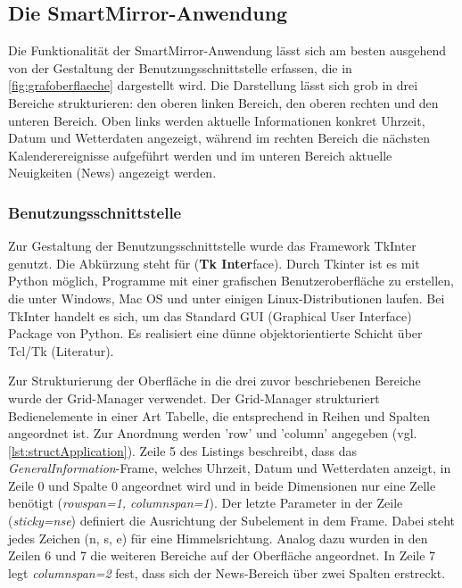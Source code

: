 \subsection{Die SmartMirror-Anwendung}
\label{smartMirror}
Die Funktionalität der SmartMirror-Anwendung lässt sich am besten ausgehend von der Gestaltung der Benutzungsschnittstelle erfassen, die in \autoref{fig:grafoberflaeche} dargestellt wird. Die Darstellung lässt sich grob in drei Bereiche strukturieren: den oberen linken Bereich, den oberen rechten und den unteren Bereich. Oben links werden aktuelle Informationen konkret Uhrzeit, Datum und Wetterdaten angezeigt, während im rechten Bereich die nächsten Kalenderereignisse aufgeführt werden und im unteren Bereich aktuelle Neuigkeiten (News) angezeigt werden. 

\subsubsection*{Benutzungsschnittstelle}

Zur Gestaltung der Benutzungsschnittstelle wurde das Framework TkInter genutzt. Die Abkürzung steht für (\textbf{Tk Inter}face).  Durch Tkinter ist es mit Python möglich, Programme mit einer grafischen Benutzeroberfläche zu erstellen, die unter Windows, Mac OS und unter einigen Linux-Distributionen laufen. Bei TkInter handelt es sich, um das Standard GUI (Graphical User Interface) Package von Python. Es realisiert eine dünne objektorientierte Schicht über Tcl/Tk (Literatur). 

Zur Strukturierung der Oberfläche in die drei zuvor beschriebenen Bereiche wurde der Grid-Manager verwendet. Der Grid-Manager strukturiert Bedienelemente in einer Art Tabelle, die entsprechend in Reihen und Spalten angeordnet ist. Zur Anordnung werden 'row' und 'column' angegeben (vgl. \autoref{lst:structApplication}). Zeile 5 des Listings beschreibt, dass das \textit{GeneralInformation}-Frame, welches Uhrzeit, Datum und Wetterdaten anzeigt, in Zeile 0 und Spalte 0 angeordnet wird und in beide Dimensionen nur eine Zelle benötigt (\textit{rowspan=1, columnspan=1}). Der letzte Parameter in der Zeile (\textit{sticky=\grqq nse\grqq}) definiert die Ausrichtung der Subelement in dem Frame. Dabei steht jedes Zeichen (n, s, e) für eine Himmelsrichtung. Analog dazu wurden in den Zeilen 6 und 7 die weiteren Bereiche auf der Oberfläche angeordnet. In Zeile 7 legt \textit{\textit{columnspan=2}} fest, dass sich der News-Bereich über zwei Spalten erstreckt.

\begin{minipage}{\textwidth}
	
\end{minipage}

